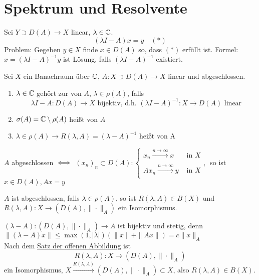 
\section{Spektrum und Resolvente}



Sei $Y \supset D(A) \rightarrow X$ linear, $\lambda \in \mathbb{C}$.
	\[ (\lambda I - A) x = y \quad (*) \label{eq:13.0-lineareGleichung} \]
Problem: Gegeben $y \in X$ finde $x \in D(A)$ so, dass \hyperref[eq:13.0-lineareGleichung]{$(*)$} erfüllt ist.
Formel: $x = (\lambda I - A)^{-1} y$ ist Lösung, falls $(\lambda I - A)^{-1}$ existiert.


\begin{definition} \label{def:13.1}
	Sei $X$ ein Banachraum über $\mathbb{C}$, $A \colon X \supset D(A) \rightarrow X$ linear und abgeschlossen.
	\begin{enumerate}[label=\alph*\upshape)]
		\item $\lambda \in \mathbb{C}$ gehört zur  von $A$, $\lambda \in \rho(A)$, falls
			\[ \lambda I - A \colon D(A) \rightarrow X \text{ bijektiv, d.h. } (\lambda I - A)^{-1} \colon X \rightarrow D(A) \text{ linear} \]
		\item $\sigma(A) = \mathbb{C} \setminus \rho(A)$ hei{\ss}t  von $A$
		\item $\lambda \in \rho(A) \rightarrow R(\lambda, A) = (\lambda - A)^{-1}$ hei{\ss}t  von A
	\end{enumerate}	
\end{definition}


\begin{erinnerung}
	$A$ abgeschlossen $\iff$ $(x_{n})_{n} \subset D(A): \begin{cases}
			x_{n} \xrightarrow[]{n \rightarrow \infty} x & \text{ in } X \\ A x_{n} \xrightarrow[]{n \rightarrow \infty} y & \text{ in } X \end{cases}$, $ $ so ist $x \in D(A), A x = y$\end{erinnerung}


\begin{bemerkung}
	$A$ ist abgeschlossen, falls $\lambda \in \rho(A)$, so ist $R(\lambda, A) \in B(X)$ und $R(\lambda, A) \colon X \rightarrow (D(A), \| \cdot \|_{A})$ ein Isomorphismus.
\end{bemerkung}

\begin{beweis}
	$(\lambda - A): (D(A), \| \cdot \|_{A}) \rightarrow A$ ist bijektiv und stetig, denn $\|(\lambda - A)x \| \leq \max(1, |\lambda|) (\|x\| + \|Ax\|) = c \| x \|_{A}$ \\
	Nach dem \hyperref[satz:10.3-offeneAbbildung]{Satz der offenen Abbildung} ist
		\[ R(\lambda, A): X \rightarrow (D(A), \| \cdot \|_{A}) \]
	ein Isomorphismus, $X \xrightarrow[]{R(\lambda, A)} (D(A), \| \cdot \|_{A}) \subset X$, also $R(\lambda, A) \in B(X)$.
\end{beweis}


